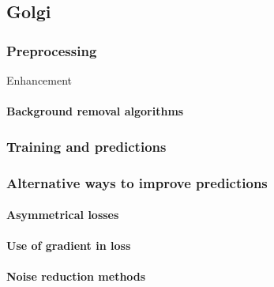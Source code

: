 \subsection{Golgi}
    \subsubsection{Preprocessing}
        Enhancement
        
        \paragraph{Background removal algorithms}
            
    \subsubsection{Training and predictions}
        

    \subsubsection{Alternative ways to improve predictions}
        \paragraph{Asymmetrical losses}
            
        \paragraph{Use of gradient in loss}
        \paragraph{Noise reduction methods}
